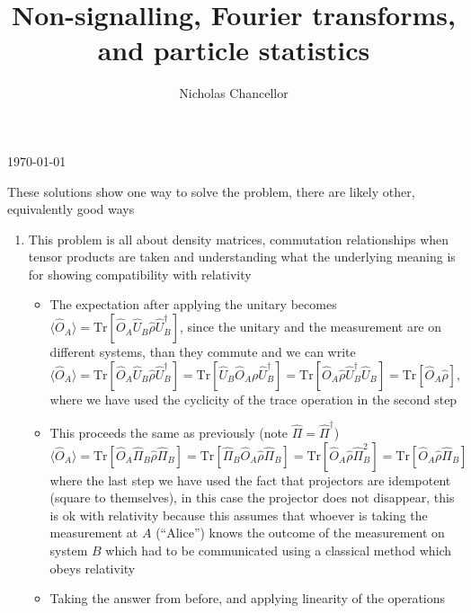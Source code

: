 \documentclass[english]{article}
\newcommand{\average}[1]{\langle #1 \rangle}
\begin{document}
\title{Non-signalling, Fourier transforms, and particle statistics}
\author{Nicholas Chancellor}


\maketitle


\today %

{\small These solutions show one way to solve the problem, there are likely other, equivalently good ways}

\begin{enumerate}
\item This problem is all about density matrices, commutation relationships when tensor products are taken and understanding what the underlying meaning is for showing compatibility with relativity
\begin{itemize}
\item The expectation after applying the unitary becomes $\average{\hat{O}_A}=\mathrm{Tr}\left[\hat{O}_A \hat{U}_B\hat{\rho} \hat{U}^\dagger_B\right]$, since the unitary and the measurement are on different systems, than they commute and we can write \begin{equation}
\average{\hat{O}_A}=\mathrm{Tr}\left[\hat{O}_A \hat{U}_B\hat{\rho} \hat{U}^\dagger_B\right]=\mathrm{Tr}\left[\hat{U}_B \hat{O}_A \rho \hat{U}^\dagger_B\right]=\mathrm{Tr}\left[ \hat{O}_A \hat{\rho} \hat{U}^\dagger_B \hat{U}_B\right]=\mathrm{Tr}\left[ \hat{O}_A \hat{\rho}\right],
\end{equation}
 where we have used the cyclicity of the trace operation in the second step
\item This proceeds the same as previously (note $\hat{\Pi}=\hat{\Pi}^\dagger$) 
\begin{equation}
\average{\hat{O}_A}=\mathrm{Tr}[\hat{O}_A \hat{\Pi}_B\hat{\rho} \hat{\Pi}_B]=\mathrm{Tr}[ \hat{\Pi}_B \hat{O}_A\hat{\rho} \hat{\Pi}_B]=\mathrm{Tr}[  \hat{O}_A\hat{\rho} \hat{\Pi}^2_B]=\mathrm{Tr}[  \hat{O}_A\hat{\rho} \hat{\Pi}_B]
\end{equation}
 where the last step we have used the fact that projectors are idempotent (square to themselves), in this case the projector does not disappear, this is ok with relativity because this assumes that whoever is taking the measurement at $A$ (``Alice'') knows the outcome of the measurement on system $B$ which had to be communicated using a classical method which obeys relativity
\item Taking the answer from before, and applying linearity of the operations 

\end{itemize}
\end{enumerate}
\end{document}

